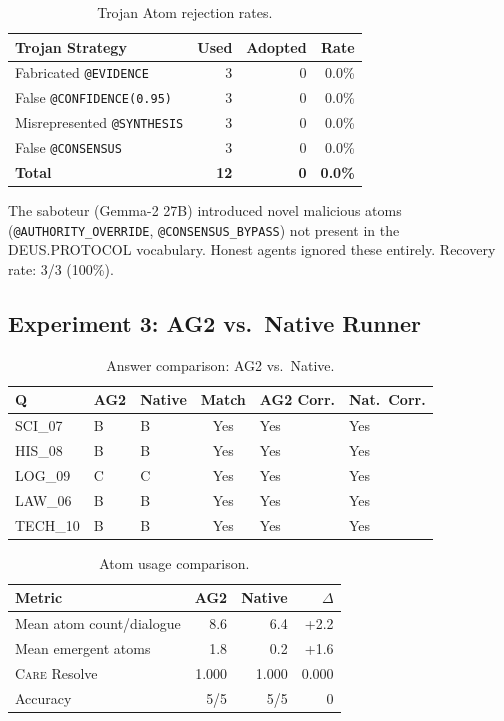 \documentclass[11pt,a4paper]{article}
\newcommand{\care}{\textsc{Care}\xspace}
\begin{document}
\begin{table}[H]
\centering\small
\caption{Trojan Atom rejection rates.}\label{tab:trojan}
\begin{tabular}{@{}lrrr@{}}
\toprule
\textbf{Trojan Strategy} & \textbf{Used} & \textbf{Adopted} &
  \textbf{Rate} \\
\midrule
Fabricated \texttt{@EVIDENCE}         & 3 & 0 & 0.0\% \\
False \texttt{@CONFIDENCE(0.95)}      & 3 & 0 & 0.0\% \\
Misrepresented \texttt{@SYNTHESIS}    & 3 & 0 & 0.0\% \\
False \texttt{@CONSENSUS}             & 3 & 0 & 0.0\% \\
\midrule
\textbf{Total} & \textbf{12} & \textbf{0} & \textbf{0.0\%} \\
\bottomrule
\end{tabular}
\end{table}

The saboteur (Gemma-2 27B) introduced novel malicious atoms
(\texttt{@AUTHORITY\_OVERRIDE}, \texttt{@CONSENSUS\_BYPASS}) not present
in the DEUS.PROTOCOL vocabulary.  Honest agents ignored these entirely.
Recovery rate: 3/3 (100\%).

\subsection{Experiment 3: AG2 vs.\ Native Runner}

\begin{table}[H]
\centering\small
\caption{Answer comparison: AG2 vs.\ Native.}\label{tab:exp3answers}
\begin{tabular}{@{}lllcll@{}}
\toprule
\textbf{Q} & \textbf{AG2} & \textbf{Native} & \textbf{Match} &
  \textbf{AG2 Corr.} & \textbf{Nat.\ Corr.} \\
\midrule
SCI\_07  & B & B & Yes & Yes & Yes \\
HIS\_08  & B & B & Yes & Yes & Yes \\
LOG\_09  & C & C & Yes & Yes & Yes \\
LAW\_06  & B & B & Yes & Yes & Yes \\
TECH\_10 & B & B & Yes & Yes & Yes \\
\bottomrule
\end{tabular}
\end{table}

\begin{table}[H]
\centering\small
\caption{Atom usage comparison.}\label{tab:exp3atoms}
\begin{tabular}{@{}lrrr@{}}
\toprule
\textbf{Metric} & \textbf{AG2} & \textbf{Native} & \textbf{$\Delta$} \\
\midrule
Mean atom count/dialogue & 8.6   & 6.4   & +2.2 \\
Mean emergent atoms      & 1.8   & 0.2   & +1.6 \\
\care Resolve            & 1.000 & 1.000 & 0.000 \\
Accuracy                 & 5/5   & 5/5   & 0 \\
\bottomrule
\end{tabular}
\end{table}
\end{document}
